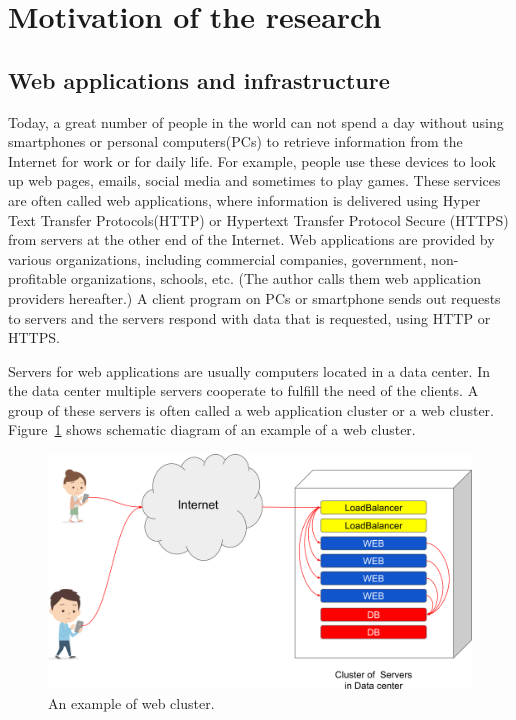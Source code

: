 
\section{Motivation of the research}

\subsection{Web applications and infrastructure}

Today, a great number of people in the world can not spend a day without using smartphones or personal computers(PCs) to retrieve information from the Internet for work or for daily life.
For example, people use these devices to look up web pages, emails, social media and sometimes to play games.
These services are often called web applications, where information is delivered using Hyper Text Transfer Protocols(HTTP) or Hypertext Transfer Protocol Secure (HTTPS) from servers at the other end of the Internet.
Web applications are provided by various organizations, including commercial companies, government, non-profitable organizations, schools, etc.
(The author calls them web application providers hereafter.)
A client program on PCs or smartphone sends out requests to servers and the servers respond with data that is requested, using HTTP or HTTPS. 

Servers for web applications are usually computers located in a data center.
In the data center multiple servers cooperate to fulfill the need of the clients.
A group of these servers is often called a web application cluster or a web cluster.
Figure~\ref{fig:web_cluster} shows schematic diagram of an example of a web cluster.

\begin{figure}[h]
\begin{center}
\includegraphics[width=0.8\columnwidth]{Figs/web_cluster.png}
\end{center}
\caption{
An example of web cluster.
}
\label{fig:web_cluster}
\end{figure}


